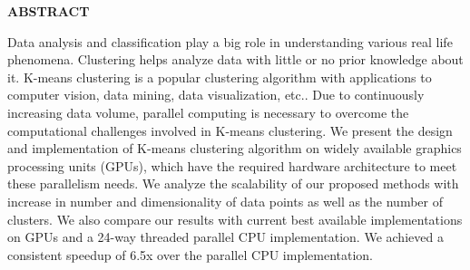 
\vspace {1.0in}
\begin{center}
\begin{large}
{\bf ABSTRACT}
\end{large}
\end{center}
\vskip 0.2in

Data analysis and classification play a big role in understanding various real life phenomena.
Clustering helps analyze data with little or no prior knowledge about it.
K-means clustering is a popular clustering algorithm with applications to computer vision, data mining, data visualization, etc.. 
Due to continuously increasing data volume, parallel computing is necessary to overcome the computational challenges involved in K-means clustering. 
We present the design and implementation of K-means clustering algorithm on widely available graphics processing units (GPUs), which have the required hardware architecture to meet these parallelism needs.
We analyze the scalability of our proposed methods with increase in number and dimensionality of data points as well as the number of clusters.
We also compare our results with current best available implementations on GPUs and a 24-way threaded parallel CPU implementation.
We achieved a consistent speedup of 6.5x over the parallel CPU implementation.
